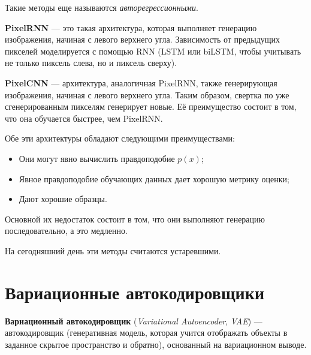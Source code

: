 \begin{remark}
    Такие методы еще называются \textit{авторегрессионными}.
\end{remark}

\begin{definition}
    \textbf{PixelRNN} --- это такая архитектура, которая выполняет генерацию изображения, начиная с левого верхнего угла. Зависимость от предыдущих пикселей моделируется с помощью RNN (LSTM или biLSTM, чтобы учитывать не только пиксель слева, но и пиксель сверху).
\end{definition}

\begin{definition}
    \textbf{PixelCNN} --- архитектура, аналогичная PixelRNN, также генерирующая изображения, начиная с левого верхнего угла. Таким образом, свертка по уже сгенерированным пикселям генерирует новые. Её преимущество состоит в том, что она обучается быстрее, чем PixelRNN.
\end{definition}

Обе эти архитектуры обладают следующими преимуществами:
\begin{itemize}
    \item Они могут явно вычислить правдоподобие $p(x)$;
    \item Явное правдоподобие обучающих данных дает хорошую метрику оценки;
    \item Дают хорошие образцы.
\end{itemize}

Основной их недостаток состоит в том, что они выполняют генерацию последовательно, а это медленно.

\begin{remark}
    На сегодняшний день эти методы считаются устаревшими.
\end{remark}

\section{Вариационные автокодировщики}

\begin{definition}
    \textbf{Вариационный автокодировщик} (\textit{Variational Autoencoder}, \textit{VAE}) — автокодировщик (генеративная модель, которая учится отображать объекты в заданное скрытое пространство и обратно), основанный на вариационном выводе.
\end{definition}


